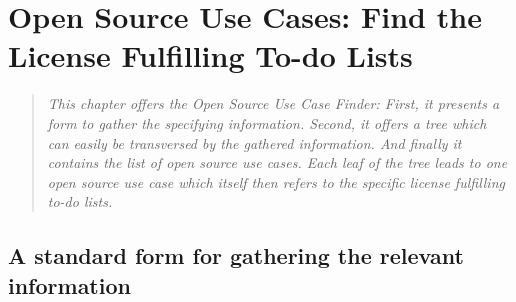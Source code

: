 %
%
%
%
%



\chapter{Open Source Use Cases: Find the License Fulfilling To-do Lists}\label{sec:OSUCfinder}

\footnotesize
\begin{quote}\itshape
This chapter offers the \emph{Open Source Use Case Finder}: First, it presents
a form to gather the specifying information. Second, it offers a tree which
can easily be transversed by the gathered information. And finally it contains
the list of \emph{open source use cases}. Each leaf of the tree leads to one
\emph{open source use case} which itself then refers to the specific license
fulfilling to-do lists.
\end{quote}
\normalsize{}

\section{A standard form for gathering the relevant information}
\label{OSLiCStandardFormForGatheringInformation}
 
